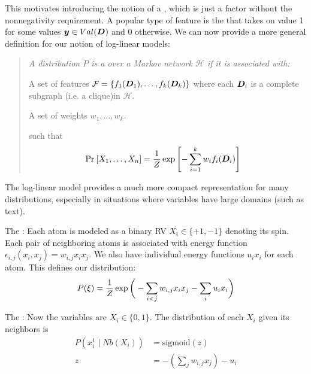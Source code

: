 \documentclass[11pt]{article}
\begin{document}
\myspace{}
This motivates introducing the notion of a , which is just a factor without the nonnegativity requirement. A popular type of feature is the  that takes on value 1 for some values $\vec y \in Val(\matr D)$ and 0 otherwise. We can now provide a more general definition for our notion of log-linear models:
\vspace{-0.5em}
\begin{quote}
	{\itshape
	A distribution $P$ is a  over a Markov network $\mathcal H$ if it is associated with:
	\begin{compactitem}
		\item A set of features $\mathcal F = \{ f_1(\matr[1]{D}), \ldots, f_k(\matr[k]{D})  \}$ where each $\matr[i]{D}$ is a complete subgraph (i.e. a clique)in $\mathcal H$. 
		\item A set of weights $w_1, \ldots, w_k$. 
	\end{compactitem} 
	such that
	\begin{align}
		\Prob{X_1, \ldots, X_n} &= \inv{Z} \exp \left[ - \sum_{i =1}^{k} w_i f_i(\matr[i]{D})  \right]
	\end{align}
	}
\end{quote}
The log-linear model provides a much more compact representation for many distributions, especially in situations where variables have large domains (such as text).\\
\begin{example}
	The : Each atom is modeled as a binary RV $X_i \in \{+1, -1\}$ denoting its spin. Each pair of neighboring atoms is associated with energy function $\epsilon_{i,j}(x_i, x_j) = w_{i,j} x_i x_j$. We also have individual energy functions $u_i x_i$ for each atom. This defines our distribution:
	\begin{align}
		P(\xi) = \inv{Z} \exp \bigg( - \sum_{i < j} w_{i,j}x_i x_j - \sum_i u_i x_i   \bigg)
	\end{align}
	
	The : Now the variables are $X_i \in \{0, 1\}$. The distribution of each $X_i$ given its neighbors is 
	\begin{align}
		P(x_i^1 \mid Nb(X_i)) &= \text{sigmoid}(z) \\
		z &= -(\sum_j w_{i,j} x_j  )-u_i
	\end{align}
\end{example}
\end{document}
